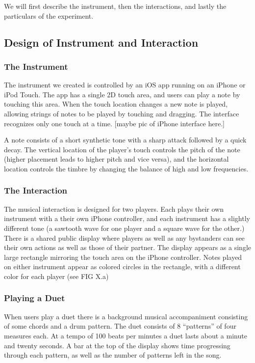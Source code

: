 \documentclass{article}
\begin{document}
We will first describe the instrument, then the interactions, and lastly the particulars of the experiment.


\subsection{Design of Instrument and Interaction}

\subsubsection{The Instrument}

The instrument we created is controlled by an iOS app running on an iPhone or iPod Touch. The app has a single 2D touch area, and users can play a note by touching this area. When the touch location changes a new note is played, allowing strings of notes to be played by touching and dragging.  The interface recognizes only one touch at a time. [maybe pic of iPhone interface here.]

A note consists of a short synthetic tone with a sharp attack followed by a quick decay.  The vertical location of the player’s touch controls the pitch of the note (higher placement leads to higher pitch and vice versa), and the horizontal location controls the timbre by changing the balance of high and low frequencies.

\subsubsection{The Interaction}

The musical interaction is designed for two players.  Each plays their own instrument with a their own iPhone controller, and each instrument has a slightly different tone (a sawtooth wave for one player and a square wave for the other.)  There is a shared public display where players as well as any bystanders can see their own actions as well as those of their partner.  The display appears as a single large rectangle mirroring the touch area on the iPhone controller.  Notes played on either instrument appear as colored circles in the rectangle, with a different color for each player (see FIG X.a)

\subsubsection{Playing a Duet}

When users play a duet there is a background musical accompaniment consisting of some chords and a drum pattern.  The duet consists of 8 “patterns” of four measures each.  At a tempo of 100 beats per minutes a duet lasts about a minute and twenty seconds.  A bar at the top of the display shows time progressing through each pattern, as well as the number of patterns left in the song.  
\end{document}
